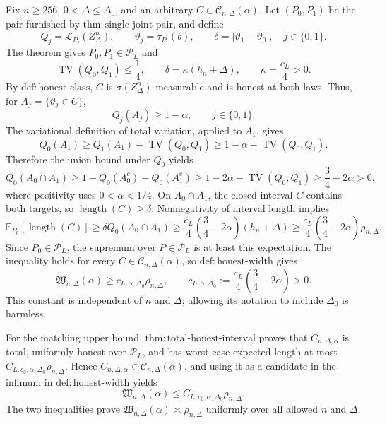Fix \(n\geq256\), \(0<\Delta\leq\Delta_0\), and an arbitrary \(C\in\mathcal C_{n,\Delta}(\alpha)\).  Let \((P_0,P_1)\) be the pair furnished by \(\mathrm{thm:single\text{-}joint\text{-}pair}\), and define
\[
 Q_j=\mathcal L_{P_j}(Z_\Delta^n),
 \qquad
 \vartheta_j=\tau_{P_j}(b),
 \qquad
 \delta=|\vartheta_1-\vartheta_0|,
 \quad j\in\{0,1\}.
\]
The theorem gives \(P_0,P_1\in\mathcal P_L\) and
\[
 \operatorname{TV}(Q_0,Q_1)\leq\frac14,
 \qquad
 \delta=\kappa(h_n+\Delta),
 \qquad
 \kappa=\frac{c_L}{4}>0.
\]
By \(\mathrm{def:honest\text{-}class}\), \(C\) is \(\sigma(Z_\Delta^n)\)-measurable and is honest at both laws.  Thus, for \(A_j=\{\vartheta_j\in C\}\),
\[
 Q_j(A_j)\geq1-\alpha,
 \qquad j\in\{0,1\}.
\]
The variational definition of total variation, applied to \(A_1\), gives
\[
 Q_0(A_1)\geq Q_1(A_1)-\operatorname{TV}(Q_0,Q_1)
 \geq1-\alpha-\operatorname{TV}(Q_0,Q_1).
\]
Therefore the union bound under \(Q_0\) yields
\[
 Q_0(A_0\cap A_1)
 \geq1-Q_0(A_0^c)-Q_0(A_1^c)
 \geq1-2\alpha-\operatorname{TV}(Q_0,Q_1)
 \geq\frac34-2\alpha>0,
\]
where positivity uses \(0<\alpha<1/4\).  On \(A_0\cap A_1\), the closed interval \(C\) contains both targets, so \(\operatorname{length}(C)\geq\delta\).  Nonnegativity of interval length implies
\[
 \mathbb E_{P_0}[\operatorname{length}(C)]
 \geq\delta Q_0(A_0\cap A_1)
 \geq\frac{c_L}{4}\left(\frac34-2\alpha\right)(h_n+\Delta)
 \geq\frac{c_L}{4}\left(\frac34-2\alpha\right)\rho_{n,\Delta}.
\]
Since \(P_0\in\mathcal P_L\), the supremum over \(P\in\mathcal P_L\) is at least this expectation.  The inequality holds for every \(C\in\mathcal C_{n,\Delta}(\alpha)\), so \(\mathrm{def:honest\text{-}width}\) gives
\[
 \mathfrak W_{n,\Delta}(\alpha)
 \geq c_{L,\alpha,\Delta_0}\rho_{n,\Delta},
 \qquad
 c_{L,\alpha,\Delta_0}:=\frac{c_L}{4}\left(\frac34-2\alpha\right)>0.
\]
This constant is independent of \(n\) and \(\Delta\); allowing its notation to include \(\Delta_0\) is harmless.

For the matching upper bound, \(\mathrm{thm:total\text{-}honest\text{-}interval}\) proves that \(C_{n,\Delta,\alpha}\) is total, uniformly honest over \(\mathcal P_L\), and has worst-case expected length at most \(C_{L,c_0,\alpha,\Delta_0}\rho_{n,\Delta}\).  Hence \(C_{n,\Delta,\alpha}\in\mathcal C_{n,\Delta}(\alpha)\), and using it as a candidate in the infimum in \(\mathrm{def:honest\text{-}width}\) yields
\[
 \mathfrak W_{n,\Delta}(\alpha)
 \leq C_{L,c_0,\alpha,\Delta_0}\rho_{n,\Delta}.
\]
The two inequalities prove \(\mathfrak W_{n,\Delta}(\alpha)\asymp\rho_{n,\Delta}\) uniformly over all allowed \(n\) and \(\Delta\).